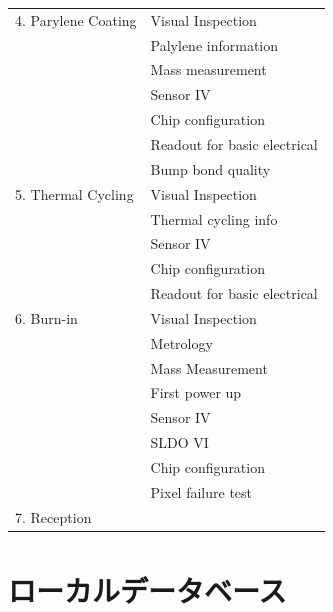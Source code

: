 \begin{table}[tbp]
\begin{center}
\begin{tabular}{|ll|}
    4. Parylene Coating     & Visual Inspection \\ 
                            & Palylene information \\
                            & Mass measurement \\
                            & Sensor IV \\
                            & Chip configuration\\
                            & Readout for basic electrical \\
                            & Bump bond quality \\\hline

    5. Thermal Cycling      & Visual Inspection \\ 
                            & Thermal cycling info \\
                            & Sensor IV \\
                            & Chip configuration\\
                            & Readout for basic electrical \\\hline

    6. Burn-in              & Visual Inspection \\ 
                            & Metrology \\
                            & Mass Measurement \\
                            & First power up\\
                            & Sensor IV\\
                            & SLDO VI\\
                            & Chip configuration\\
                            & Pixel failure test\\\hline

    7. Reception            & \\\hline 
  \end{tabular}
\end{center}
\end{table}

\newpage

\section{ローカルデータベース}
